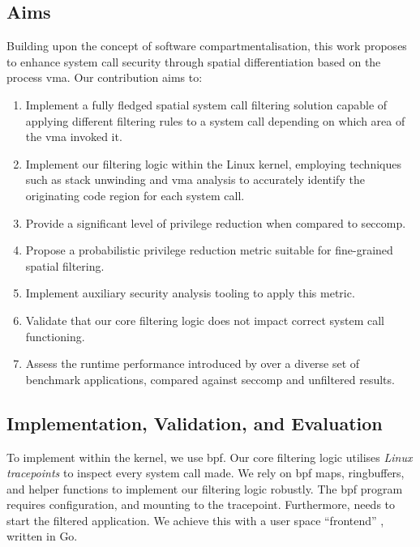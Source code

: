 \subsection{Aims}

Building upon the concept of software compartmentalisation, this work
proposes \af to enhance system call security through spatial
differentiation based on the process \ac{vma}. Our contribution aims to:

\begin{enumerate}
    \item Implement a fully fledged spatial system call filtering solution capable of applying different filtering rules to a system call depending on which area of the \ac{vma} invoked it.
    \item Implement our filtering logic within the Linux kernel, employing techniques such as stack unwinding and \ac{vma} analysis to accurately identify the originating code region for each system call.
    \item Provide a significant level of privilege reduction when compared to seccomp.
    \item Propose a probabilistic privilege reduction metric suitable for fine-grained spatial filtering. %
    \item Implement auxiliary security analysis tooling to apply this metric. %
    \item Validate that our core filtering logic does not impact correct system call functioning.
    \item Assess the runtime performance introduced by \af{} over a diverse set of benchmark applications, compared against seccomp and unfiltered results.
\end{enumerate}

\subsection{Implementation, Validation, and Evaluation}

To implement \af within the kernel, we use \ac{bpf}. Our core filtering logic
utilises \textit{Linux tracepoints} to inspect every system call made. 
We rely on \ac{bpf} maps, ringbuffers, and helper functions to
implement our filtering logic robustly. The \ac{bpf} program requires configuration,
and mounting to the tracepoint. Furthermore, \af needs to start the filtered
application. We achieve this with a user space ``frontend'' , written in Go.

